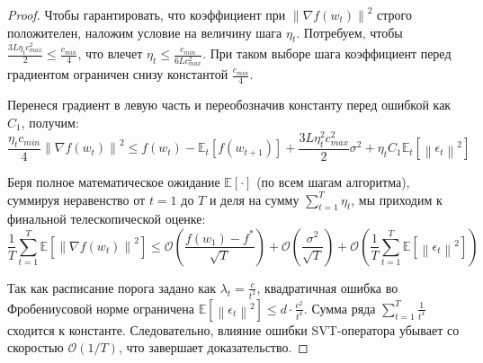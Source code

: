 \documentclass[11pt]{article}
\newcommand{\E}{\mathbb{E}}
\newcommand{\norm}[1]{\left\|#1\right\|}
\begin{document}
\begin{proof}
Чтобы гарантировать, что коэффициент при $\norm{\nabla f(w_t)}^2$ строго положителен, наложим условие на величину шага $\eta_t$. Потребуем, чтобы $\frac{3 L \eta_t c_{max}^2}{2} \le \frac{c_{min}}{4}$, что влечет $\eta_t \le \frac{c_{min}}{6 L c_{max}^2}$. При таком выборе шага коэффициент перед градиентом ограничен снизу константой $\frac{c_{min}}{4}$. 

Перенеся градиент в левую часть и переобозначив константу перед ошибкой как $C_1$, получим:
\begin{equation}
    \frac{\eta_t c_{min}}{4} \norm{\nabla f(w_t)}^2 \le f(w_t) - \E_t [f(w_{t+1})] + \frac{3 L \eta_t^2 c_{max}^2}{2} \sigma^2 + \eta_t C_1 \E_t[\norm{\epsilon_t}^2]
\end{equation}

Беря полное математическое ожидание $\E[\cdot]$ (по всем шагам алгоритма), суммируя неравенство от $t=1$ до $T$ и деля на сумму $\sum_{t=1}^T \eta_t$, мы приходим к финальной телескопической оценке:
\begin{equation}
    \frac{1}{T} \sum_{t=1}^T \E[\norm{\nabla f(w_t)}^2] \le \mathcal{O}\left( \frac{f(w_1) - f^*}{\sqrt{T}} \right) + \mathcal{O}\left( \frac{\sigma^2}{\sqrt{T}} \right) + \mathcal{O}\left( \frac{1}{T} \sum_{t=1}^T \E[\norm{\epsilon_t}^2] \right)
\end{equation}

Так как расписание порога задано как $\lambda_t = \frac{c}{t^2}$, квадратичная ошибка во Фробениусовой норме ограничена $\E[\norm{\epsilon_t}^2] \le d \cdot \frac{c^2}{t^4}$.
Сумма ряда $\sum_{t=1}^T \frac{1}{t^4}$ сходится к константе. Следовательно, влияние ошибки SVT-оператора убывает со скоростью $\mathcal{O}(1/T)$, что завершает доказательство.

\end{proof}
\end{document}
